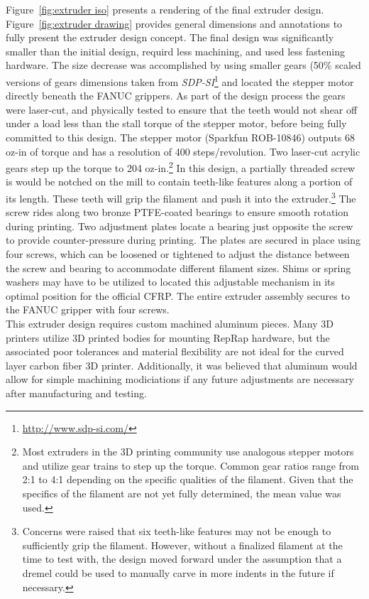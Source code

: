 Figure~\ref{fig:extruder iso} presents a rendering of the final extruder design. Figure~\ref{fig:extruder drawing} provides general dimensions and annotations to fully present the extruder design concept. The final design was significantly smaller than the initial design, requird less machining, and used less fastening hardware. The size decrease was accomplished by using smaller gears (50\% scaled versions of gears dimensions taken from \emph{SDP-SI}\footnote{\url{http://www.sdp-si.com/}} and located the stepper motor directly beneath the FANUC grippers. As part of the design process the gears were laser-cut, and physically tested to ensure that the teeth would not shear off under a load less than the stall torque of the stepper motor, before being fully committed to this design. The stepper motor (Sparkfun ROB-10846) outputs 68 oz-in of torque and has a resolution of 400 steps/revolution. Two laser-cut acrylic gears step up the torque to 204 oz-in.\footnote{Most extruders in the 3D printing community use analogous stepper motors and utilize gear trains to step up the torque. Common gear ratios range from 2:1 to 4:1 depending on the specific qualities of the filament. Given that the specifics of the filament are not yet fully determined, the mean value was used.} In this design, a partially threaded screw is would be notched on the mill to contain teeth-like features along a portion of its length. These teeth will grip the filament and push it into the extruder.\footnote{Concerns were raised that six teeth-like features may not be enough to sufficiently grip the filament. However, without a finalized filament at the time to test with, the design moved forward under the assumption that a dremel could be used to manually carve in more indents in the future if necessary.} The screw rides along two bronze PTFE-coated bearings to ensure smooth rotation during printing. Two adjustment plates locate a bearing just opposite the screw to provide counter-pressure during printing. The plates are secured in place using four screws, which can be loosened or tightened to adjust the distance between the screw and bearing to accommodate different filament sizes. Shims or spring washers may have to be utilized to located this adjustable mechanism in its optimal position for the official CFRP. The entire extruder assembly secures to the FANUC gripper with four screws.\\

This extruder design requires custom machined aluminum pieces. Many 3D printers utilize 3D printed bodies for mounting RepRap hardware, but the associated poor tolerances and material flexibility are not ideal for the curved layer carbon fiber 3D printer. Additionally, it was believed that aluminum would allow for simple machining modiciations if any future adjustments are necessary after manufacturing and testing.\\

